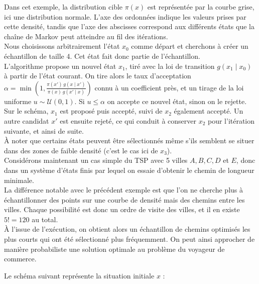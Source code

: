 \documentclass{article}
\begin{document}
Dans cet exemple, la distribution cible $\pi(x)$ est représentée par la courbe grise, ici une distribution normale. L'axe des ordonnées indique les valeurs prises par cette densité, tandis que l'axe des abscisses correspond aux différents états que la chaîne de Markov peut atteindre au fil des itérations. \\
Nous choisissons arbitrairement l'état $x_0$ comme départ et cherchons à créer un échantillon de taille 4. Cet état fait donc partie de l'échantillon. \\
L'algorithme propose un nouvel état $x_1$, tiré avec la loi de transition $g(x_1 \mid x_0)$ à partir de l'état courant. On tire alors le taux d'acceptation $\alpha = \min\left(1, \frac{\pi(x') \, g(x \mid x')}{\pi(x) \, g(x' \mid x)}\right)$ connu à un coefficient près, et un tirage de la loi uniforme $u \sim \mathcal{U}(0,1)$. 
Si $u \leqslant \alpha$ on accepte ce nouvel état, sinon on le rejette. \\
Sur le schéma, $x_1$ est proposé puis accepté, suivi de $x_2$ également accepté. Un autre candidat $x'$ est ensuite rejeté, ce qui conduit à conserver $x_2$ pour l'itération suivante, et ainsi de suite. \\
À noter que certains états peuvent être sélectionnés même s'ils semblent se situer dans des zones de faible densité (c'est le cas ici de $x_3$). \\

Considérons maintenant un cas simple du TSP avec 5 villes $A, B, C, D$ et $E$, donc dans un système d'états finis par lequel on essaie d'obtenir le chemin de longueur minimale. \\
La différence notable avec le précédent exemple est que l'on ne cherche plus à échantillonner des points sur une courbe de densité mais des chemins entre les villes. Chaque possibilité est donc un ordre de visite des villes, et il en existe $5! = 120$ au total. \\
À l'issue de l'exécution, on obtient alors un échantillon de chemins optimisés les plus courts qui ont été sélectionné plus fréquemment. On peut ainsi approcher de manière probabiliste une solution optimale au problème du voyageur de commerce.

Le schéma suivant représente la situation initiale $x$ :
\begin{center}
\end{center}
\end{document}
